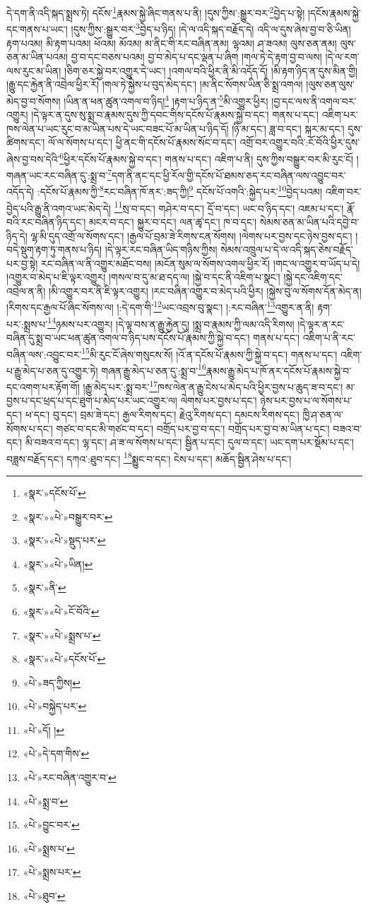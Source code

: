 དེ་དག་ནི་འདི་སྐད་སྨྲས་ཏེ། དངོས་\footnote{«སྣར་»དངོས་པོ་}རྣམས་སྐྱེ་ཞིང་གནས་པ་ནི། །དུས་ཀྱིས་:སྒྱུར་བར་\footnote{«སྣར་»«པེ་»བསྒྱུར་བར་}བྱེད་པ་སྟེ། །དངོས་རྣམས་སྐྱེ་དང་གནས་པ་ཡང་། །དུས་ཀྱིས་:སྒྱུར་བར་\footnote{«སྣར་»«པེ་»སྡུད་པར་}བྱེད་པ་ཉིད། །དེ་ལ་འདི་སྐད་བརྗོད་དེ། འདི་ལ་དུས་ཞེས་བྱ་བ་ཅི་ཡིན། རྟག་པའམ། མི་རྟག་པའམ། ཕོའམ། མོའམ། མ་ནིང་གི་རང་བཞིན་ནམ། ལྷའམ། ཤ་ཟའམ། ལུས་ཅན་ནམ། ལུས་ཅན་མ་ཡིན་པའམ། བྱ་བ་དང་བཅས་པའམ། བྱ་བ་མེད་པ་དང་ལྡན་པ་ཞིག །གལ་ཏེ་དེ་རྟག་བྱ་བ་ལས། །དེ་ལ་རག་ལས་རུང་མ་ཡིན། །ཅིག་ཅར་སྐྱེ་བར་འགྱུར་དེ་ཡང་། །འགལ་བའི་ཕྱིར་ནི་མི་འདོད་དོ། །མི་རྟག་ཉིད་ན་དུས་མིན་གྱི། །རྒྱུ་དང་རྐྱེན་ནི་འབྲེལ་ཕྱིར་རོ། །གལ་ཏེ་སྐྱེས་པ་བུད་མེད་དང་། །མ་ནིང་སོགས་ཡིན་ཅི་སྨྲ་འགལ། །ལུས་ཅན་ལུས་མེད་བྱ་བ་སོགས། །ཡིན་ན་ཕན་ཚུན་འགལ་བ་ཉིད།\footnote{«སྣར་»«པེ་»ཡིན།} །རྟག་པ་ཉིད་ན་\footnote{«སྣར་»ནི་}མི་འགྱུར་ཕྱིར། །བྱ་དང་ལས་ནི་འགལ་བར་འགྱུར། །དེ་ལྟར་ན་དུས་སུ་སྨྲ་བ་རྣམས་དུས་ཀྱི་དབང་གིས་དངོས་པོ་རྣམས་སྐྱེ་བ་དང་། གནས་པ་དང་། འཇིག་པར་ཁས་ལེན་པ་ཡང་རུང་བ་མ་ཡིན་པས་དེ་ཡང་བཟང་པོ་མ་ཡིན་པ་ཉིད་དོ། །ཉི་མ་དང་། ཟླ་བ་དང་། སྐར་མ་དང་། དུས་ཚིགས་དང་། ལོ་ལ་སོགས་པ་དང་། ཕྱི་ནང་གི་དངོས་པོ་རྣམས་སོང་བ་དང་། འགྲོ་བར་འགྱུར་བའི་:ངོ་བོའི་ཕྱིར་དུས་ཞེས་བྱ་བས་དེའི་\footnote{«སྣར་»«པེ་»ངོ་བོའི་}ཕྱིར་དངོས་པོ་རྣམས་སྐྱེ་བ་དང་། གནས་པ་དང་། འཇིག་པ་ནི། དུས་ཀྱིས་བསྒྱུར་བར་མི་རུང་ངོ། །གཞན་ཡང་རང་བཞིན་དུ་:སྨྲ་བ་\footnote{«སྣར་»«པེ་»སྨྲས་པ་}དག་ནི་ནང་དང་ཕྱི་རོལ་གྱི་དངོས་པོ་ཐམས་ཅད་རང་བཞིན་ལས་འབྱུང་བར་འདོད་དེ། :དངོས་པོ་རྣམས་ཀྱི་\footnote{«སྣར་»«པེ་»དངོས་པོ་}རང་བཞིན་ཁོ་ནར་:ཟད་ཀྱི།\footnote{«པེ་»ཟད་ཀྱིས།} དངོས་པོ་འགའི་:སྐྱེད་པར་\footnote{«པེ་»བསྐྱེད་པར་}བྱེད་པའམ། འཇིག་བར་བྱེད་པའི་རྒྱུ་ནི་འགའ་ཡང་མེད་དེ། \footnote{«པེ་»དོ། ། }སྲ་བ་དང་། གཤེར་བ་དང་། དྲོ་བ་དང་། ཡང་བ་ཉིད་དང་། འཇམ་པ་དང་། རྣོ་བའི་རང་བཞིན་ཉིད་དང་། མངར་བ་དང་། སྐྱུར་བ་དང་། ལན་ཚྭ་དང་། ཁ་བ་དང་། སེམས་ཅན་མ་ཡིན་པའི་དབྱེ་བ་ཉིད་དེ། ལྷ་མི་དུད་འགྲོ་ལ་སོགས་དང་། །རྒྱལ་པོ་བྲམ་ཟེ་རིགས་ངན་སོགས། །ལེགས་པར་བྱས་དང་ཉེས་བྱས་དང་། །བདེ་སྡུག་རྟག་ཏུ་གནས་པ་ཉིད། །དེ་ལྟར་རང་བཞིན་ཡིད་གཉིས་ཀྱིས། སེམས་འཁྲུལ་པ་དེ་ལ་འདི་སྐད་ཅེས་བརྗོད་པར་བྱ་སྟེ། རང་བཞིན་ལ་ནི་འགྱུར་མཐོང་བས། །མངོན་སུམ་ལ་སོགས་འགལ་ཕྱིར་རོ། །གང་ལ་འགྱུར་བ་ཡོད་པ་དེ། །འགྱུར་བ་མེད་པ་ཇི་ལྟར་འགྱུར། །གསལ་བ་དུ་མ་ཐ་དད་ལ། །སྐྱེ་བ་དང་ནི་འཇིག་པ་སྣང་། །སྐྱེ་དང་འཇིག་དང་འབྲེལ་ན་ནི། །མི་འགྱུར་བར་ནི་ཇི་ལྟར་འགྱུར། །རང་བཞིན་འགྱུར་བ་མེད་པའི་ཕྱིར། །སྐྱེས་བུ་ལ་སོགས་དོན་མེད་ན། །རིགས་དང་རྒྱལ་པོ་ཞིང་སོགས་ལ། །:དེ་དག་གི་\footnote{«པེ་»དེ་དག་གིས་}ཡང་འབྲས་བུ་སྣང་། །:རང་བཞིན་\footnote{«པེ་»རང་བཞིན་འགྱུར་བ་}འགྱུར་ན་ནི། རྟག་པར་:སྨྲས་པ་\footnote{«པེ་»སྨྲ་བ་}ཉམས་པར་འགྱུར། །དེ་ལྟ་བས་ན་རྒྱུ་རྐྱེན་དུ། །སྨྲ་བ་རྣམས་ཀྱི་ལམ་འདི་རིགས། །དེ་ལྟར་ན་རང་བཞིན་དུ་སྨྲ་བ་ཡང་ཕན་ཚུན་འགལ་བ་ཉིད་པས་དངོས་པོ་རྣམས་ཀྱི་སྐྱེ་བ་དང་། གནས་པ་དང་། འཇིག་པ་ནི་རང་བཞིན་ལས་:འབྱུང་བར་\footnote{«པེ་»བྱུང་བར་}མི་རུང་ངོ་ཞེས་གསུངས་སོ། །འོ་ན་དངོས་པོ་རྣམས་ཀྱི་སྐྱེ་བ་དང་། གནས་པ་དང་། འཇིག་པ་རྒྱུ་མེད་པ་ཅན་དུ་འགྱུར་ཏེ། གཞན་རྒྱུ་མེད་པ་ཅན་དུ་:སྨྲ་བ་\footnote{«པེ་»སྨྲས་པ་}རྣམས་རྒྱུ་མེད་པ་ཁོ་ནར་དངོས་པོ་རྣམས་སྐྱེ་བ་དང་འགག་པར་རྟོག་གོ། །རྒྱུ་མེད་པར་:སྨྲ་བར་\footnote{«པེ་»སྨྲས་པར་}ཁས་ལེན་ན་རྒྱུ་ངེས་པ་མེད་པའི་ཕྱིར་བྱས་པ་ཆུད་ཟ་བ་དང་། མ་བྱས་པ་དང་ཕྲད་པ་དང་ཐུག་པ་མེད་པར་ཡང་འགྱུར་ལ། ལེགས་པར་བྱས་པ་དང་། ཉེས་པར་བྱས་པ་ལ་སོགས་པ་དང་། ཕ་དང་། བུ་དང་། བྲམ་ཟེ་དང་། རྒྱལ་རིགས་དང་། རྗེའུ་རིགས་དང་། དམངས་རིགས་དང་། ཁྱི་ཤ་ཅན་ལ་སོགས་པ་དང་། གཙང་བ་དང་མི་གཙང་བ་དང་། བགྲོད་པར་བྱ་བ་དང་། བགྲོད་པར་བྱ་བ་མ་ཡིན་པ་དང་། བཟའ་བ་དང་། མི་བཟའ་བ་དང་། ལྷ་དང་། ཤ་ཟ་ལ་སོགས་པ་དང་། སྦྱིན་པ་དང་། དུལ་བ་དང་། ཡང་དག་པར་སྡོམ་པ་དང་། བཟླས་བརྗོད་དང་། དཀའ་:ཐུབ་དང་། \footnote{«པེ་»ཐུབ་}སྨྱུང་བ་དང་། ངེས་པ་དང་། མཆོད་སྦྱིན་ཤེས་པ་དང་། 